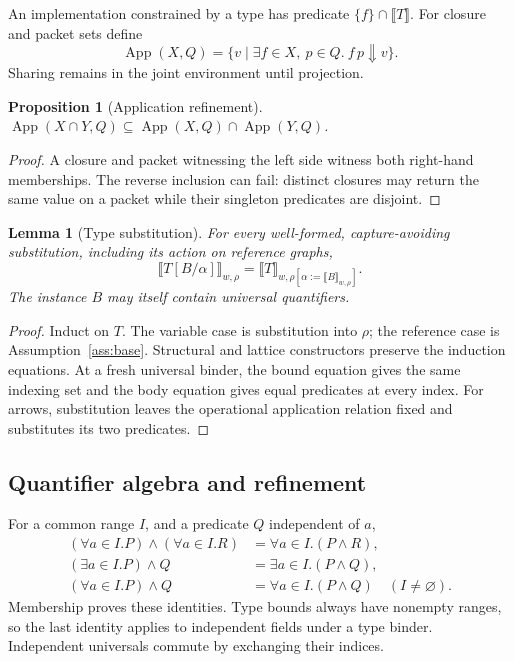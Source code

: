 \documentclass[10pt,a4paper]{article}
\newcommand{\sem}[1]{\llbracket #1\rrbracket}
\newcommand{\App}{\operatorname{App}}
\newtheorem{lemma}[definition]{Lemma}
\newtheorem{proposition}[definition]{Proposition}
\theoremstyle{remark}
\begin{document}
An implementation constrained by a type has predicate $\{f\}\cap\sem T$.
For closure and packet sets define
\[
 \App(X,Q)=\{v\mid\exists f\in X,\ p\in Q.\ f\,p\Downarrow v\}.
\]
Sharing remains in the joint environment until projection.
\begin{proposition}[Application refinement]\label{prop:app}
$\App(X\cap Y,Q)\subseteq\App(X,Q)\cap\App(Y,Q)$.
\end{proposition}
\begin{proof}
A closure and packet witnessing the left side witness both right-hand
memberships. The reverse inclusion can fail: distinct closures may return the
same value on a packet while their singleton predicates are disjoint.
\end{proof}

\begin{lemma}[Type substitution]\label{lem:substitution}
For every well-formed, capture-avoiding substitution, including its action on
reference graphs,
\[
 \sem{T[B/\alpha]}_{w,\rho}
 =\sem T_{w,\rho[\alpha:=\sem B_{w,\rho}]}.
\]
The instance $B$ may itself contain universal quantifiers.
\end{lemma}
\begin{proof}
Induct on $T$. The variable case is substitution into $\rho$; the reference
case is Assumption~\ref{ass:base}. Structural and lattice constructors preserve
the induction equations. At a fresh universal binder, the bound equation gives
the same indexing set and the body equation gives equal predicates at every
index. For arrows, substitution leaves the operational application relation
fixed and substitutes its two predicates.
\end{proof}

\subsection{Quantifier algebra and refinement}
For a common range $I$, and a predicate $Q$ independent of $a$,
\begin{align}
 (\forall a\in I.P)\land(\forall a\in I.R)
       &=\forall a\in I.(P\land R),\label{eq:forallmeet}\\
 (\exists a\in I.P)\land Q
       &=\exists a\in I.(P\land Q),\label{eq:frobenius}\\
 (\forall a\in I.P)\land Q
       &=\forall a\in I.(P\land Q)\quad(I\ne\varnothing).
       \label{eq:floating}
\end{align}
Membership proves these identities. Type bounds always have nonempty ranges,
so the last identity applies to independent fields under a type binder.
Independent universals commute by exchanging their indices.
\end{document}

